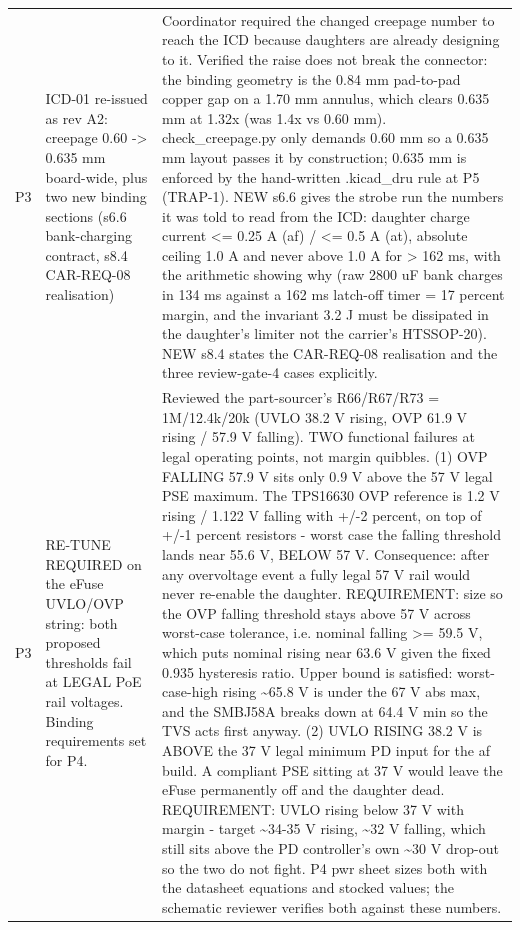 \documentclass[11pt,a4paper]{article}
\begin{document}
{\begin{longtable}{lp{5.2cm}p{7.2cm}}
P3 & ICD-01 re-issued as rev A2: creepage 0.60 -\textgreater{} 0.635 mm board-wide, plus two new binding sections (s6.6 bank-charging contract, s8.4 CAR-REQ-08 realisation) & Coordinator required the changed creepage number to reach the ICD because daughters are already designing to it. Verified the raise does not break the connector: the binding geometry is the 0.84 mm pad-to-pad copper gap on a 1.70 mm annulus, which clears 0.635 mm at 1.32x (was 1.4x vs 0.60 mm). check\_creepage.py only demands 0.60 mm so a 0.635 mm layout passes it by construction; 0.635 mm is enforced by the hand-written .kicad\_dru rule at P5 (TRAP-1). NEW s6.6 gives the strobe run the numbers it was told to read from the ICD: daughter charge current \textless{}= 0.25 A (af) / \textless{}= 0.5 A (at), absolute ceiling 1.0 A and never above 1.0 A for \textgreater{} 162 ms, with the arithmetic showing why (raw 2800 uF bank charges in 134 ms against a 162 ms latch-off timer = 17 percent margin, and the invariant 3.2 J must be dissipated in the daughter's limiter not the carrier's HTSSOP-20). NEW s8.4 states the CAR-REQ-08 realisation and the three review-gate-4 cases explicitly. \\
P3 & RE-TUNE REQUIRED on the eFuse UVLO/OVP string: both proposed thresholds fail at LEGAL PoE rail voltages. Binding requirements set for P4. & Reviewed the part-sourcer's R66/R67/R73 = 1M/12.4k/20k (UVLO 38.2 V rising, OVP 61.9 V rising / 57.9 V falling). TWO functional failures at legal operating points, not margin quibbles. (1) OVP FALLING 57.9 V sits only 0.9 V above the 57 V legal PSE maximum. The TPS16630 OVP reference is 1.2 V rising / 1.122 V falling with +/-2 percent, on top of +/-1 percent resistors - worst case the falling threshold lands near 55.6 V, BELOW 57 V. Consequence: after any overvoltage event a fully legal 57 V rail would never re-enable the daughter. REQUIREMENT: size so the OVP falling threshold stays above 57 V across worst-case tolerance, i.e. nominal falling \textgreater{}= 59.5 V, which puts nominal rising near 63.6 V given the fixed 0.935 hysteresis ratio. Upper bound is satisfied: worst-case-high rising \textasciitilde{}65.8 V is under the 67 V abs max, and the SMBJ58A breaks down at 64.4 V min so the TVS acts first anyway. (2) UVLO RISING 38.2 V is ABOVE the 37 V legal minimum PD input for the af build. A compliant PSE sitting at 37 V would leave the eFuse permanently off and the daughter dead. REQUIREMENT: UVLO rising below 37 V with margin - target \textasciitilde{}34-35 V rising, \textasciitilde{}32 V falling, which still sits above the PD controller's own \textasciitilde{}30 V drop-out so the two do not fight. P4 pwr sheet sizes both with the datasheet equations and stocked values; the schematic reviewer verifies both against these numbers. \\

\end{longtable}}
\end{document}
